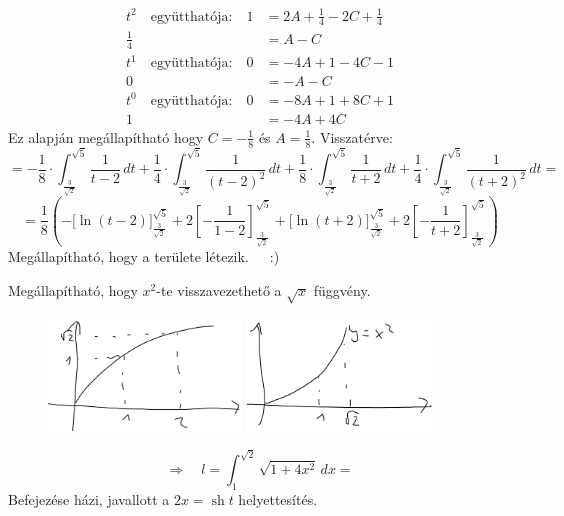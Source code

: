 \documentclass[a4paper,11.5pt]{article}
\DeclareMathOperator{\sh}{sh}
\begin{document}
\begin{exercise}
\begin{align*}
			t^2 \quad \text{együtthatója:}\quad 
												1&=2A+\frac{1}{4}-2C+\frac{1}{4}\\
											   \frac{1}{4}&=A-C\\
			t^1 \quad \text{együtthatója:}\quad 0&=-4A+1-4C-1\\
												0&=-A-C\\
			t^0 \quad \text{együtthatója:}\quad 0&=-8A+1+8C+1\\
												1&=-4A+4C
		\end{align*}
		Ez alapján megállapítható hogy $C=-\frac{1}{8}$ és $A=\frac{1}{8}$. Visszatérve:
		\[=-\frac{1}{8}\cdot\int_{\frac{3}{\sqrt{2}}}^{\sqrt{5}}\frac{1}{t-2}\,dt+\frac{1}{4}\cdot\int_{\frac{3}{\sqrt{2}}}^{\sqrt{5}}\frac{1}{(t-2)^2}\,dt+\frac{1}{8}\cdot\int_{\frac{3}{\sqrt{2}}}^{\sqrt{5}}\frac{1}{t+2}\,dt+\frac{1}{4}\cdot\int_{\frac{3}{\sqrt{2}}}^{\sqrt{5}}\frac{1	}{(t+2)^2}\,dt=\]
		\[= \frac{1}{8}\left(-\Big[\ln(t-2)\Big]^{\sqrt{5}}_{\frac{3}{\sqrt{2}}}+2\left[-\frac{1}{1-2}\right]^{\sqrt{5}}_{\frac{3}{\sqrt{2}}}+\Big[\ln(t+2)\Big]^{\sqrt{5}}_{\frac{3}{\sqrt{2}}}+2\left[-\frac{1}{t+2}\right]^{\sqrt{5}}_{\frac{3}{\sqrt{2}}} \right)\]
		Megállapítható, hogy a területe létezik.~~~:)
	\end{exercise}
	\begin{note}
		Megállapítható, hogy $x^2$-te visszavezethető a $\sqrt{x}$ függvény.
		
		\begin{figure}[H]
			\centering
			\includegraphics[height=3cm]{../2zh/kepek/13.png}\quad \quad \quad 
			\includegraphics[height=3cm]{../2zh/kepek/14.png}
			\caption{}
		\end{figure}
		\[ \Rightarrow\quad l=\int_1^{\sqrt{2}}\sqrt{1+4x^2}\,dx= \]
		Befejezése házi, javallott a $2x=\sh t$ helyettesítés.
	\end{note}
\end{document}
